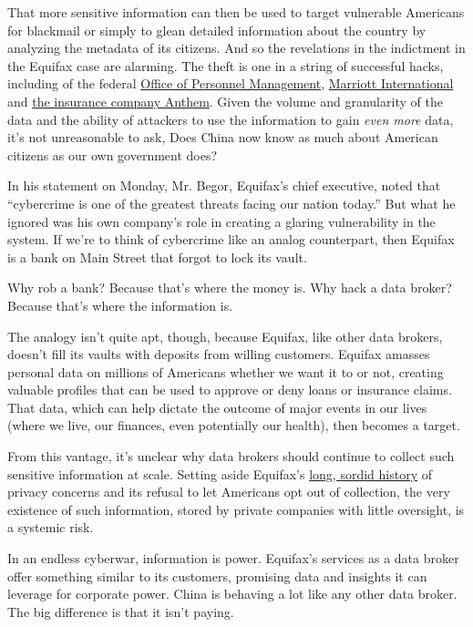 That more sensitive information can then be used to target vulnerable
Americans for blackmail or simply to glean detailed information about
the country by analyzing the metadata of its citizens. And so the
revelations in the indictment in the Equifax case are alarming. The
theft is one in a string of successful hacks, including of the federal
\href{https://www.nytimes.com/2015/08/01/world/asia/us-decides-to-retaliate-against-chinas-hacking.html}{Office
of Personnel Management},
\href{https://www.nytimes.com/2019/01/04/us/politics/marriott-hack-passports.html}{Marriott
International} and
\href{https://www.nytimes.com/2019/05/09/technology/anthem-hack-indicted-breach.html}{the
insurance company Anthem}. Given the volume and granularity of the data
and the ability of attackers to use the information to gain \emph{even
more} data, it's not unreasonable to ask, Does China now know as much
about American citizens as our own government does?

In his statement on Monday, Mr. Begor, Equifax's chief executive, noted
that ``cybercrime is one of the greatest threats facing our nation
today.'' But what he ignored was his own company's role in creating a
glaring vulnerability in the system. If we're to think of cybercrime
like an analog counterpart, then Equifax is a bank on Main Street that
forgot to lock its vault.

Why rob a bank? Because that's where the money is. Why hack a data
broker? Because that's where the information is.

The analogy isn't quite apt, though, because Equifax, like other data
brokers, doesn't fill its vaults with deposits from willing customers.
Equifax amasses personal data on millions of Americans whether we want
it to or not, creating valuable profiles that can be used to approve or
deny loans or insurance claims. That data, which can help dictate the
outcome of major events in our lives (where we live, our finances, even
potentially our health), then becomes a target.

From this vantage, it's unclear why data brokers should continue to
collect such sensitive information at scale. Setting aside Equifax's
\href{https://www.wired.com/1995/09/equifax/}{long, sordid history} of
privacy concerns and its refusal to let Americans opt out of collection,
the very existence of such information, stored by private companies with
little oversight, is a systemic risk.

In an endless cyberwar, information is power. Equifax's services as a
data broker offer something similar to its customers, promising data and
insights it can leverage for corporate power. China is behaving a lot
like any other data broker. The big difference is that it isn't paying.

